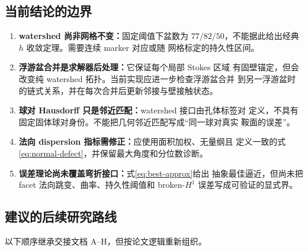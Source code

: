 \documentclass[UTF8,zihao=-4]{ctexart}
\begin{document}
\subsection{当前结论的边界}

\begin{enumerate}
  \item \textbf{watershed 尚非网格不变：}固定阈值下盆数为
  $77/82/50$，不能据此给出经典 $h$ 收敛定理。需要连续 marker 对应或随
  网格标定的持久性区间。
  \item \textbf{浮游盆合并是求解器后处理：}它保证每个局部 Stokes 区域
  有固壁锚定，但会改变纯 watershed 拓扑。当前实现应进一步检查浮游盆合并
  到另一浮游盆时的链式关系，并在每次合并后更新邻接与壁接触状态。
  \item \textbf{球对 Hausdorff 只是邻近匹配：}watershed 接口由孔体标签对
  定义，不具有固定固体球对身份。不能把几何邻近匹配写成``同一球对真实
  鞍面的误差''。
  \item \textbf{法向 dispersion 指标需修正：}应使用面积加权、无量纲且
  定义一致的式\eqref{eq:normal-defect}，并保留最大角度和分位数诊断。
  \item \textbf{误差理论尚未覆盖弯折接口：}式\eqref{eq:best-approx}给出
  抽象最佳逼近，但尚未把 facet 法向跳变、曲率、持久性阈值和 broken-$H^1$
  误差写成可验证的显式界。
\end{enumerate}

\subsection{建议的后续研究路线}

以下顺序继承交接文档 A--H，但按论文逻辑重新组织。
\end{document}
